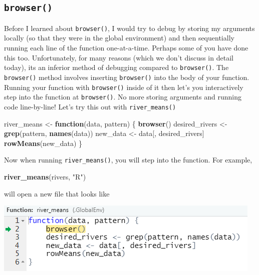 \documentclass[
]{book}
\newenvironment{Shaded}{\begin{snugshade}}{\end{snugshade}}
\newcommand{\ControlFlowTok}[1]{\textcolor[rgb]{0.13,0.29,0.53}{\textbf{#1}}}
\newcommand{\KeywordTok}[1]{\textcolor[rgb]{0.13,0.29,0.53}{\textbf{#1}}}
\newcommand{\NormalTok}[1]{#1}
\newcommand{\StringTok}[1]{\textcolor[rgb]{0.31,0.60,0.02}{#1}}
\begin{document}
\hypertarget{browser}{%
\subsection{\texorpdfstring{\texttt{browser()}}{browser()}}\label{browser}}

Before I learned about \texttt{browser()}, I would try to debug by storing my arguments locally (so that they were in the global environment) and then sequentially running each line of the function one-at-a-time. Perhaps some of you have done this too. Unfortunately, for many reasons (which we don't discuss in detail today), its an inferior method of debugging compared to \texttt{browser()}. The \texttt{browser()} method involves inserting \texttt{browser()} into the body of your function. Running your function with \texttt{browser()} inside of it then let's you interactively step into the function at \texttt{browser()}. No more storing arguments and running code line-by-line! Let's try this out with \texttt{river\_means()}

\begin{Shaded}
\begin{Highlighting}[]
\NormalTok{river_means <-}\StringTok{ }\ControlFlowTok{function}\NormalTok{(data, pattern) \{}
  \KeywordTok{browser}\NormalTok{()}
\NormalTok{  desired_rivers <-}\StringTok{ }\KeywordTok{grep}\NormalTok{(pattern, }\KeywordTok{names}\NormalTok{(data))}
\NormalTok{  new_data <-}\StringTok{ }\NormalTok{data[, desired_rivers]}
  \KeywordTok{rowMeans}\NormalTok{(new_data)}
\NormalTok{\}}
\end{Highlighting}
\end{Shaded}

Now when running \texttt{river\_means()}, you will step into the function. For example,

\begin{Shaded}
\begin{Highlighting}[]
\KeywordTok{river_means}\NormalTok{(rivers, }\StringTok{"R"}\NormalTok{)}
\end{Highlighting}
\end{Shaded}

will open a new file that looks like

\includegraphics[width=1\linewidth]{images/newrpack_files7}
\end{document}
